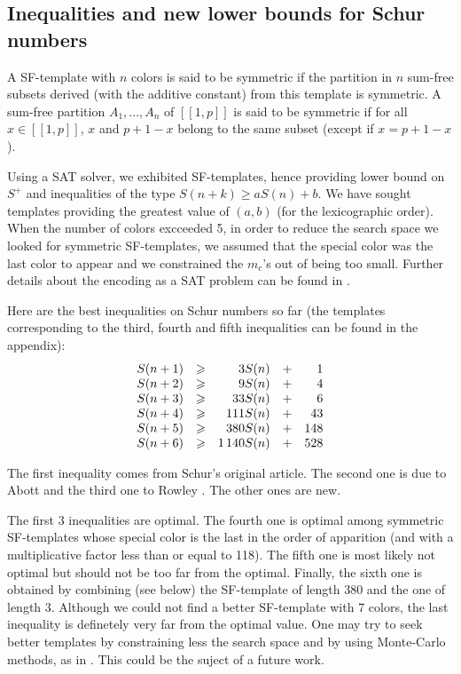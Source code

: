 \subsection{Inequalities and new lower bounds for Schur numbers}

\begin{definition}
A SF-template with \(n\) colors is said to be symmetric if the partition in \(n\) sum-free subsets derived (with the additive constant) from this template is symmetric. 
A sum-free partition \(A_1, ..., A_n\) of \([\![1, p]\!]\) is said to be symmetric if for all \( x \in [\![1, p]\!]\), \(x\) and \(p + 1 - x\) belong to the same subset 
(except if \(x = p + 1 - x\)).
\end{definition}

Using a SAT solver, we exhibited SF-templates, hence providing lower bound on \(S^+\) and inequalities 
of the type \(S(n+k) \geqslant a S(n) + b\). We have sought templates providing the greatest value of 
\((a, b)\) (for the lexicographic order). When the number of colors excceeded 5, in order to reduce the search space we 
looked for symmetric SF-templates, we assumed that the special color was the last color to appear and we constrained 
the \(m_c\)'s out of being too small. Further details about the encoding as a SAT problem can be found in \cite{Heule2017}.

\par
Here are the best inequalities on Schur numbers so far (the templates corresponding to the third, fourth and fifth 
inequalities can be found in the appendix):
\[
\begin{array}{r r r r r}
	S(n + 1) & \geqslant & 3 S(n) & + & 1 \\
	S(n + 2) & \geqslant & 9 S(n) & + & 4 \\
	S(n + 3) & \geqslant & 33 S(n) & + & 6 \\
	S(n + 4) & \geqslant & 111 S(n) & + & 43 \\
	S(n + 5) & \geqslant & 380 S(n) & + & 148 \\
	S(n + 6) & \geqslant & 1\,140 S(n) & + & 528 \\
\end{array}
\]

The first inequality comes from  Schur's original article\cite{Schur1917}. The second one is due to
Abott \cite{AbbottHanson}
and the third one to Rowley \cite{RowleyRamsey}. The other ones are new.

\par
The first 3 inequalities are optimal. The fourth one is optimal among symmetric SF-templates whose special color is 
the last in the order of apparition (and with a multiplicative factor less than or equal to 118). The fifth one is most 
likely not optimal but should not be too far from the optimal. 
Finally, the sixth one is obtained by combining (see below) the SF-template of length 380 and the one of length 3. 
Although we could not find a better SF-template with 7 colors, the last inequality is definetely very far from the 
optimal value. One may try to seek better templates by constraining less the search space and by using 
Monte-Carlo methods, as in \cite{Bouzy2015AnAP}. This could be the suject of a future work.

